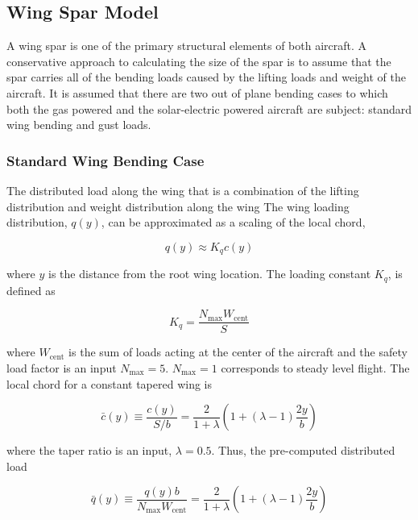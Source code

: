 \subsection{Wing Spar Model}

A wing spar is one of the primary structural elements of both aircraft. 
A conservative approach to calculating the size of the spar is to assume that the spar carries all of the bending loads caused by the lifting loads and weight of the aircraft.  
It is assumed that there are two out of plane bending cases to which both the gas powered and the solar-electric powered aircraft are subject: standard wing bending and gust loads. 

\subsubsection{Standard Wing Bending Case}

The distributed load along the wing that is a combination of the lifting distribution and weight distribution along the wing
The wing loading distribution, $q(y)$, can be approximated as a scaling of the local chord,\cite{bending}

\begin{equation}
    \label{e:wingloading}
    q(y) \approx K_q c(y) 
\end{equation}

where $y$ is the distance from the root wing location. The loading constant $K_q$\cite{bending}, is defined as

\begin{equation}
    \label{e:kq}
    K_q = \frac{N_{\text{max}}W_{\text{cent}}}{S}
\end{equation}

where $W_{\text{cent}}$ is the sum of loads acting at the center of the aircraft and the safety load factor is an input $N_{\text{max}}=5$.  $N_{\text{max}}=1$ corresponds to steady level flight. The local chord for a constant tapered wing\cite{bending} is 

\begin{equation}
    \label{e:localchord}
    \bar{c}(y) \equiv \frac{c(y)}{S/b} = \frac{2}{1+\lambda} \left( 1 + (\lambda - 1) \frac{2y}{b} \right)
\end{equation}

where the taper ratio is an input, $\lambda=0.5$.  Thus, the pre-computed distributed load 

\begin{equation}
    \label{e:qbar}
    \bar{q}(y) \equiv \frac{q(y)b}{N_{\text{max}}W_{\text{cent}}} = \frac{2}{1+\lambda} \left( 1 + (\lambda - 1) \frac{2y}{b} \right)
\end{equation}

